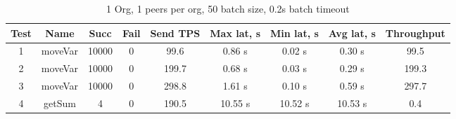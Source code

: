 \begin{appendices}
\begin{table}[h!]
\begin{center}
\begin{tabular}{ |c|c|c|c|c|c|c|c|c| }
 \hline
  Test & Name & Succ  & Fail & Send TPS & Max lat, s & Min lat, s & Avg lat, s & Throughput \\
 \hline
 \hline
 1 & moveVar  & 10000  & 0 & 99.6 & 0.86 s & 0.02 s & 0.30 s & 99.5  \\
  \hline
 2 & moveVar  & 10000  & 0 & 199.7  & 0.68 s & 0.03 s & 0.29 s & 199.3 \\
  \hline
 3 & moveVar  & 10000  & 0 & 298.8  & 1.61 s & 0.10 s & 0.59 s & 297.7 \\
  \hline
 4 & getSum  & 4  & 0  & 190.5  & 10.55 s  & 10.52 s  & 10.53 s  & 0.4 \\
 \hline
\end{tabular}
\end{center}
\caption{1 Org, 1 peers per org, 50 batch size, 0.2s batch timeout}
\end{table}

\end{appendices}
